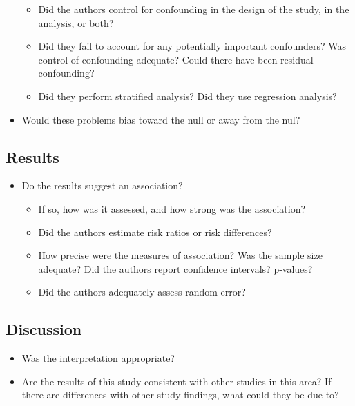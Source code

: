 \documentclass[]{book}
\providecommand{\tightlist}{%
  \setlength{\itemsep}{0pt}\setlength{\parskip}{0pt}}
\begin{document}
\begin{itemize}
  \begin{itemize}
  \tightlist
  \item
    Did the authors control for confounding in the design of the study, in the analysis, or both?
  \item
    Did they fail to account for any potentially important confounders? Was control of confounding adequate? Could there have been residual confounding?
  \item
    Did they perform stratified analysis? Did they use regression analysis?
  \end{itemize}
\item
  Would these problems bias toward the null or away from the nul?
\end{itemize}

\hypertarget{results}{%
\subsection{Results}\label{results}}

\begin{itemize}
\tightlist
\item
  Do the results suggest an association?

  \begin{itemize}
  \tightlist
  \item
    If so, how was it assessed, and how strong was the association?
  \item
    Did the authors estimate risk ratios or risk differences?
  \item
    How precise were the measures of association? Was the sample size adequate? Did the authors report confidence intervals? p-values?
  \item
    Did the authors adequately assess random error?
  \end{itemize}
\end{itemize}

\hypertarget{discussion}{%
\subsection{Discussion}\label{discussion}}

\begin{itemize}
\tightlist
\item
  Was the interpretation appropriate?
\item
  Are the results of this study consistent with other studies in this area? If there are differences with other study findings, what could they be due to?
\end{itemize}
\end{document}
